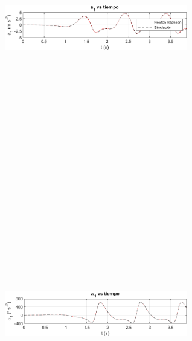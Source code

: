 \documentclass[12pt]{article}
\begin{document}
\begin{figure} [H]
        \centerline{\includegraphics[width=8cm, height=12cm,keepaspectratio]{Inventor vs NR/a1 vs inventor.png}}
    \end{figure}
    \vspace{-25pt}
        \begin{figure} [H]
        \centerline{\includegraphics[width=8cm, height=12cm,keepaspectratio]{Inventor vs NR/alpha1 vs inventor.png}}
    \end{figure}
\end{document}
